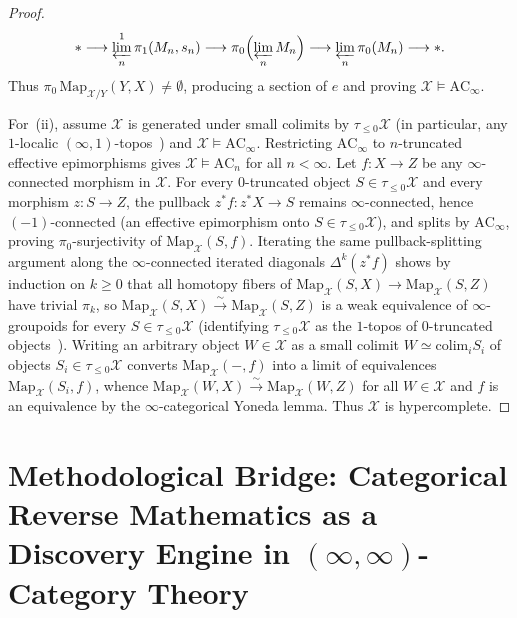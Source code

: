 \documentclass[10pt,twoside,openright]{book}
\theoremstyle{crmplain}
\theoremstyle{crmdef}
\theoremstyle{crmremark}
\begin{document}
\begin{proof}
\[
  * \longrightarrow \varprojlim^1_n \pi_1(M_n, s_n) \longrightarrow \pi_0\Bigl(\varprojlim_n M_n\Bigr) \longrightarrow \varprojlim_n \pi_0(M_n) \longrightarrow *.
\]
Thus $\pi_0\,\mathrm{Map}_{\mathcal{X}/Y}(Y, X) \neq \emptyset$, producing a section of $e$ and proving $\mathcal{X} \models \mathrm{AC}_\infty$.

For~(ii), assume $\mathcal{X}$ is generated under small colimits by $\tau_{\le 0}\mathcal{X}$ (in particular, any $1$-localic $(\infty, 1)$-topos~\cite[\S 6.4.5]{Lurie09}) and $\mathcal{X} \models \mathrm{AC}_\infty$. Restricting $\mathrm{AC}_\infty$ to $n$-truncated effective epimorphisms gives $\mathcal{X} \models \mathrm{AC}_n$ for all $n < \infty$. Let $f : X \to Z$ be any $\infty$-connected morphism in $\mathcal{X}$. For every $0$-truncated object $S \in \tau_{\le 0}\mathcal{X}$ and every morphism $z : S \to Z$, the pullback $z^* f : z^* X \to S$ remains $\infty$-connected, hence $(-1)$-connected (an effective epimorphism onto $S \in \tau_{\le 0}\mathcal{X}$), and splits by $\mathrm{AC}_\infty$, proving $\pi_0$-surjectivity of $\mathrm{Map}_{\mathcal{X}}(S, f)$. Iterating the same pullback-splitting argument along the $\infty$-connected iterated diagonals $\Delta^k(z^* f)$ shows by induction on $k \ge 0$ that all homotopy fibers of $\mathrm{Map}_{\mathcal{X}}(S, X) \to \mathrm{Map}_{\mathcal{X}}(S, Z)$ have trivial $\pi_k$, so $\mathrm{Map}_{\mathcal{X}}(S, X) \xrightarrow{\sim} \mathrm{Map}_{\mathcal{X}}(S, Z)$ is a weak equivalence of $\infty$-groupoids for every $S \in \tau_{\le 0}\mathcal{X}$ (identifying $\tau_{\le 0}\mathcal{X}$ as the $1$-topos of $0$-truncated objects~\cite[Prop.~5.5.6.28]{Lurie09}). Writing an arbitrary object $W \in \mathcal{X}$ as a small colimit $W \simeq \mathrm{colim}_i S_i$ of objects $S_i \in \tau_{\le 0}\mathcal{X}$ converts $\mathrm{Map}_{\mathcal{X}}(-, f)$ into a limit of equivalences $\mathrm{Map}_{\mathcal{X}}(S_i, f)$, whence $\mathrm{Map}_{\mathcal{X}}(W, X) \xrightarrow{\sim} \mathrm{Map}_{\mathcal{X}}(W, Z)$ for all $W \in \mathcal{X}$ and $f$ is an equivalence by the $\infty$-categorical Yoneda lemma. Thus $\mathcal{X}$ is hypercomplete.
\end{proof}

\section{Methodological Bridge: Categorical Reverse Mathematics as a Discovery Engine in \texorpdfstring{$(\infty,\infty)$}{(infinity,infinity)}-Category Theory}\label{subsec:crm-discovery-engine-inf-inf}
\end{document}
